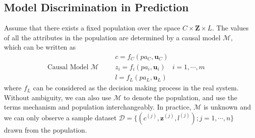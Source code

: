 \documentclass{article}
\begin{document}

\subsection{Model Discrimination in Prediction}

Assume that there exists a fixed population over the space $C\times \mathbf{Z}\times L$. The values of all the attributes in the population are determined by a causal model $\mathcal{M}$, which can be written as
\begin{equation*}
\textrm{Causal Model $\mathcal{M}$} \quad\quad
\begin{array}{l}
c = f_{C}(pa_{C},\mathbf{u}_{C}) \\
z_{i} = f_{i}(pa_{i},\mathbf{u}_{i}) \quad i=1,\cdots,m \\
l = f_{L}(pa_{L},\mathbf{u}_{L})
\end{array}
\end{equation*}
where $f_{L}$ can be considered as the decision making process in the real system.
Without ambiguity, we can also use $\mathcal{M}$ to denote the population, and use the terms mechanism and population interchangeably. In practice, $\mathcal{M}$ is unknown and we can only observe a sample dataset $\mathcal{D}=\{(c^{(j)},\mathbf{z}^{(j)}, l^{(j)});j=1,\cdots,n\}$ drawn from the population.
\end{document}

